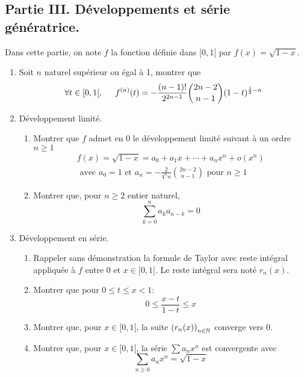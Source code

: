 \subsection*{Partie III. Développements et série génératrice.}
Dans cette partie, on note $f$ la fonction définie dans $[0,1[$ par $f(x) =\sqrt{1-x}$. 
\begin{enumerate}

\item Soit $n$ naturel supérieur ou égal à 1, montrer que
\begin{displaymath}
\forall t\in [0,1[,\hspace{0.5cm}
f^{(n)}(t) = -\frac{(n-1)!}{2^{2n-1}}\binom{2n-2}{n-1}(1-t)^{\frac{1}{2}-n}
\end{displaymath}

\item Développement limité.
\begin{enumerate}
  \item Montrer que $f$ admet en $0$ le développement limité suivant à un ordre $n\geq 1$ 
\begin{multline*}
f(x)=\sqrt{1-x}=a_0+a_1x+\cdots+a_nx^n +o(x^n)\\
\text{ avec } a_0 = 1 \text{ et }
a_n = -\frac{2}{4^n n}\binom{2n-2}{n-1} \text{ pour } n\geq 1
\end{multline*}
\item Montrer que, pour $n\geq 2$ entier naturel,
\begin{displaymath}
  \sum_{k=0}^n a_ka_{n-k} = 0
\end{displaymath}
\end{enumerate}

\item Développement en série.
\begin{enumerate}
\item Rappeler sans démonstration la formule de Taylor avec reste intégral appliquée à $f$ entre $0$ et $x\in[0,1[$. Le reste intégral sera noté $r_n(x)$.
\item Montrer que pour $0\leq t \leq x <1$:
\begin{displaymath}
  0\leq \frac{x-t}{1-t} \leq x
\end{displaymath}
\item Montrer que, pour $x\in [0,1[$, la suite $\left( r_n(x)\right)_{n\in \mathbb{N}}$ converge vers $0$.
\item Montrer que, pour $x\in [0,1[$, la série $\sum a_nx^n$ est convergente avec
\begin{displaymath}
  \sum_{n\geq 0} a_nx^n = \sqrt{1-x}
\end{displaymath}
\end{enumerate}


\end{enumerate}
